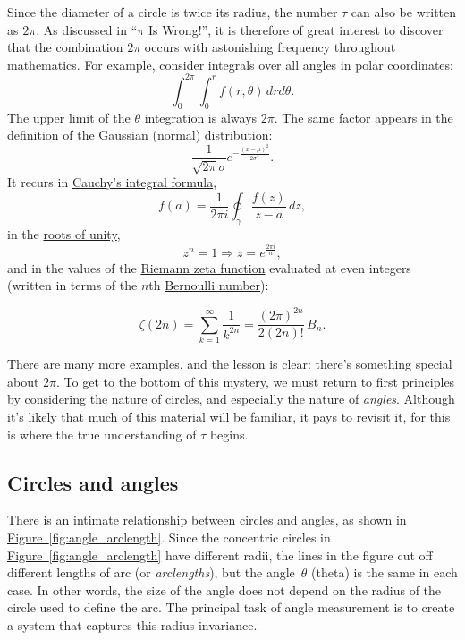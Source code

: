 \documentclass{article}
\begin{document}
Since the diameter of a circle is twice its radius, the number $\tau$ can also be written as $2\pi$. As discussed in ``$\pi$ Is Wrong!'', it is therefore of great interest to discover that the combination $2\pi$ occurs with astonishing frequency throughout mathematics. For example, consider integrals over all angles in polar coordinates:
\[
  \int_0^{2\pi}\int_0^r f(r, \theta)\, dr d\theta.
\]
The upper limit of the $\theta$ integration is always $2\pi$. The same factor appears in the definition of the \href{http://en.wikipedia.org/wiki/Normal_distribution}{Gaussian (normal) distribution}:
\[
  \frac{1}{\sqrt{2\pi}\sigma}e^{-\frac{(x-\mu)^2}{2\sigma^2}}.
\]
It recurs in \href{http://en.wikipedia.org/wiki/Cauchy's_integral_formula}{Cauchy's integral formula},
\[
  f(a) = \frac{1}{2\pi i}\oint_\gamma\frac{f(z)}{z-a}\,dz,
\]
in the \href{http://en.wikipedia.org/wiki/Root_of_unity}{roots of unity},
\[
  z^n = 1 \Rightarrow z = e^\frac{2\pi i}{n},
\]
and in the values of the \href{http://en.wikipedia.org/wiki/Riemann_zeta_function}{Riemann zeta function} evaluated at even integers (written in terms of the $n$th \href{http://en.wikipedia.org/wiki/Bernoulli_number}{Bernoulli number}):

\[
  \zeta(2n) = \sum_{k=1}^\infty \frac{1}{k^{2n}} = \frac{(2\pi)^{2n}}{2(2n)!}\,B_n.
\]

There are many more examples, and the lesson is clear: there's something special about $2\pi$. To get to the bottom of this mystery, we must return to first principles by considering the nature of circles, and especially the nature of \emph{angles}. Although it's likely that much of this material will be familiar, it pays to revisit it, for this is where the true understanding of $\tau$ begins.

  \subsection{Circles and angles} %
  \label{sec:circles_and_angles}

There is an intimate relationship between circles and angles, as shown in \hyperref[fig:angle_arclength]{Figure~}\ref{fig:angle_arclength}. Since the concentric circles in \hyperref[fig:angle_arclength]{Figure~}\ref{fig:angle_arclength} have different radii, the lines in the figure cut off different lengths of arc (or \emph{arclengths}), but the angle~$\theta$ (theta) is the same in each case. In other words, the size of the angle does not depend on the radius of the circle used to define the arc. The principal task of angle measurement is to create a system that captures this radius-invariance.
\end{document}
